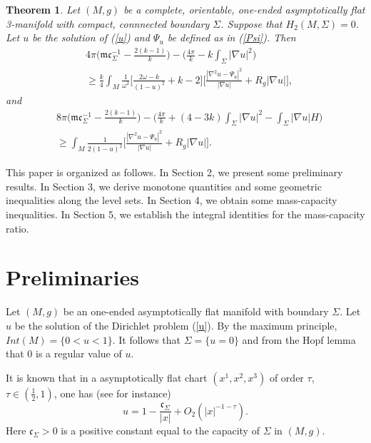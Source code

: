 \documentclass[12pt]{article}
\theoremstyle{definition}
\theoremstyle{plain}
\newtheorem{theorem}{Theorem}[section]
\numberwithin{equation}{section}
\begin{document}
\begin{theorem}\label{th 1.6}
	Let $ (M,g) $ be a complete, orientable, one-ended asymptotically flat 3-manifold with compact, connnected boundary $ \Sigma $. Suppose that $ H_{2}(M,\Sigma)=0 $. Let $ u $ be the solution of (\ref{u}) and $ \Psi_{u} $ be defined as in (\ref{Psi}). Then
	\begin{equation}\label{int 1}
	\begin{aligned}
	&4\pi \Big(\mathfrak{m}\mathfrak{c}_{\Sigma}^{-1}-\frac{2(k-1)}{k}\Big)-\Big(\frac{4\pi}{k}-k\int_{\Sigma}|\nabla u|^{2}\Big)\\
	&\geq \frac{k}{4}\int_{M}\frac{1}{\omega^{2}}\Big[\frac{2\omega-k}{(1-u)^{2}}+k-2\Big]\Big[\frac{|\nabla^{2}u-\Psi_{u}|^{2}}{|\nabla u|}+R_{g}|\nabla u|\Big],
	\end{aligned}
	\end{equation}
	and
	\begin{equation}\label{int 2}
	\begin{aligned}
	&8\pi\Big(\mathfrak{m}\mathfrak{c}_{\Sigma}^{-1}-\frac{2(k-1)}{k}\Big)-\Big(\frac{4\pi}{k}+(4-3k)\int_{\Sigma}|\nabla u|^{2}-\int_{\Sigma}|\nabla u|H\Big)\\
	&\geq \int_{M}\frac{1}{2(1-u)^{2}}\Big[\frac{|\nabla^{2}u-\Psi_{u}|^{2}}{|\nabla u|}+R_{g}|\nabla u|\Big].
	\end{aligned}
	\end{equation}
\end{theorem}
This paper is organized as follows. In Section 2, we present some preliminary results. In Section 3, we derive monotone quantities and some geometric inequalities along the level sets. In Section 4, we obtain some mass-capacity inequalities. In Section 5, we establish the integral identities for the mass-capacity ratio. 
\section{\bf Preliminaries}
Let $ (M,g) $ be an one-ended asymptotically flat manifold with boundary $ \Sigma $. Let $ u $ be the solution of the Dirichlet problem (\ref{u}). By the maximum principle, $ Int(M)=\{0<u<1\} $. It follows that $ \Sigma=\{u=0\} $ and from the Hopf lemma that $ 0 $ is a regular value of $ u $.

It is known that in a asymptotically flat chart $ (x^{1},x^{2},x^{3}) $ of order $ \tau $, $\tau \in (\frac{1}{2},1)$, one has (see \cite{Mantou} for instance)
$$
u=1-\frac{\mathfrak{c}_{\Sigma}}{|x|}+O_{2}(|x|^{-1-\tau}).
$$
Here $ \mathfrak{c}_{\Sigma}>0 $ is a positive constant equal to the capacity of $ \Sigma $ in $ (M,g) $.
\end{document}
